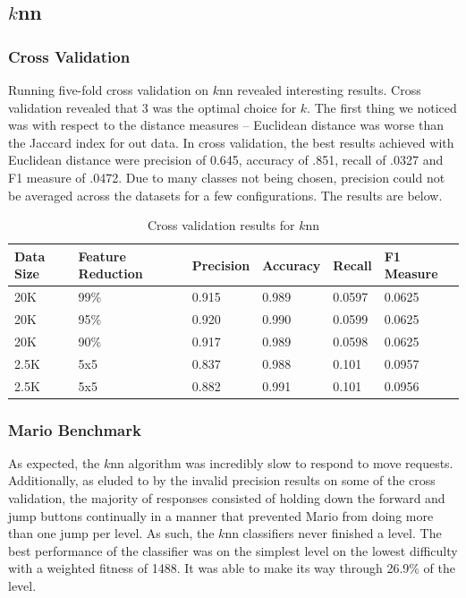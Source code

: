 \documentclass[]{article}   %
\begin{document}
\subsection{$k$nn}
\subsubsection{Cross Validation}
Running five-fold cross validation on $k$nn revealed interesting results. Cross validation revealed that 3 was the optimal
choice for $k$. The first thing we noticed was with respect to the distance measures -- Euclidean distance was worse than
the Jaccard index for out data. In cross validation, the best results achieved with Euclidean distance were precision of 0.645,
accuracy of .851, recall of .0327 and F1 measure of .0472. Due to many classes not being chosen, precision could not be averaged
across the datasets for a few configurations. The results are below.

\begin{table}[h!]
	\begin{center}
		\caption{Cross validation results for $k$nn}
		\begin{tabular}{l | l || l | l | l | l }
		Data Size & Feature Reduction & Precision & Accuracy & Recall & F1 Measure \\
		\hline
		20K & 99\% & 0.915 & 0.989 & 0.0597 & 0.0625 \\
		20K & 95\% & 0.920 & 0.990 & 0.0599 & 0.0625 \\
		20K & 90\% & 0.917 & 0.989 & 0.0598 & 0.0625 \\
		2.5K & 5x5 & 0.837 & 0.988 & 0.101 & 0.0957 \\
		2.5K & 5x5 & 0.882 & 0.991 & 0.101 & 0.0956 \\
		\hline
		\end{tabular}
	\end{center}
\end{table}

\subsubsection{Mario Benchmark}
As expected, the $k$nn algorithm was incredibly slow to respond to move requests. Additionally, as eluded to by the invalid precision
results on some of the cross validation, the majority of responses consisted of holding down the forward and jump buttons continually
in a manner that prevented Mario from doing more than one jump per level. As such, the $k$nn classifiers never finished a level. The best
performance of the classifier was on the simplest level on the lowest difficulty with a weighted fitness of 1488. It was able to make its
way through 26.9\% of the level.
\end{document}

